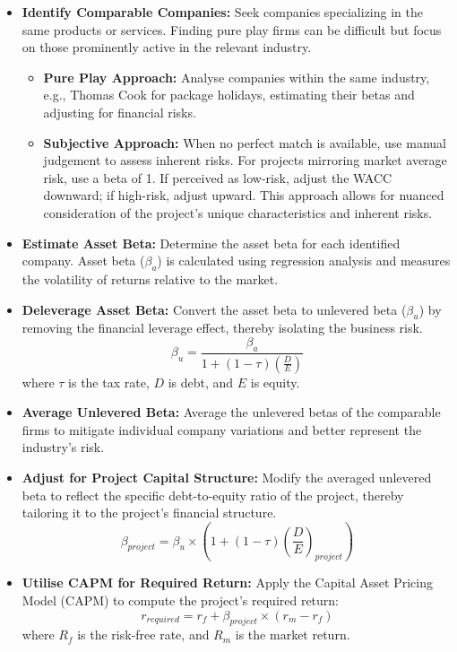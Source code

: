 \begin{itemize}
    \item \textbf{Identify Comparable Companies:} Seek companies specializing in the same products or services. Finding pure play firms can be difficult but focus on those prominently active in the relevant industry.
      \begin{itemize}
        \item \textbf{Pure Play Approach:} Analyse companies within the same industry, e.g., Thomas Cook for package holidays, estimating their betas and adjusting for financial risks.
        \item \textbf{Subjective Approach:} When no perfect match is available, use manual judgement to assess inherent risks. For projects mirroring market average risk, use a beta of 1. If perceived as low-risk, adjust the WACC downward; if high-risk, adjust upward. This approach allows for nuanced consideration of the project's unique characteristics and inherent risks.
      \end{itemize}
    \item \textbf{Estimate Asset Beta:} Determine the asset beta for each identified company. Asset beta (\(\beta_a\)) is calculated using regression analysis and measures the volatility of returns relative to the market.
    \item \textbf{Deleverage Asset Beta:} Convert the asset beta to unlevered beta (\(\beta_u\)) by removing the financial leverage effect, thereby isolating the business risk.
    \begin{equation}
        \beta_u = \frac{\beta_a}{1 + (1 - \tau) \left(\frac{D}{E}\right)}
    \end{equation}
      where \( \tau \) is the tax rate, \( D \) is debt, and \( E \) is equity.
    \item \textbf{Average Unlevered Beta:} Average the unlevered betas of the comparable firms to mitigate individual company variations and better represent the industry’s risk.
    \item \textbf{Adjust for Project Capital Structure:} Modify the averaged unlevered beta to reflect the specific debt-to-equity ratio of the project, thereby tailoring it to the project’s financial structure.
      \begin{equation}
      \beta_{project} = \beta_u \times \left(1 + (1 - \tau) \left(\frac{D}{E}\right)_{project}\right)
\end{equation}
    \item \textbf{Utilise CAPM for Required Return:} Apply the Capital Asset Pricing Model (CAPM) to compute the project's required return:
    \begin{equation}
        r_{required} = r_f + \beta_{project} \times (r_m - r_f)
    \end{equation}
      where \( R_f \) is the risk-free rate, and \( R_m \) is the market return.
  \end{itemize}

  